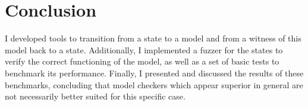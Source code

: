 \chapter{Conclusion}
I developed tools to transition from a state to a model and from a witness
of this model back to a state. Additionally, I implemented a fuzzer for the
states to verify the correct functioning of the model, as well as a set of
basic tests to benchmark its performance. Finally, I presented and discussed
the results of these benchmarks, concluding that model checkers which appear
superior in general are not necessarily better suited for this specific case.
